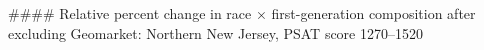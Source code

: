 #### Relative percent change in race × first-generation composition after excluding Geomarket: Northern New Jersey, PSAT score 1270–1520
